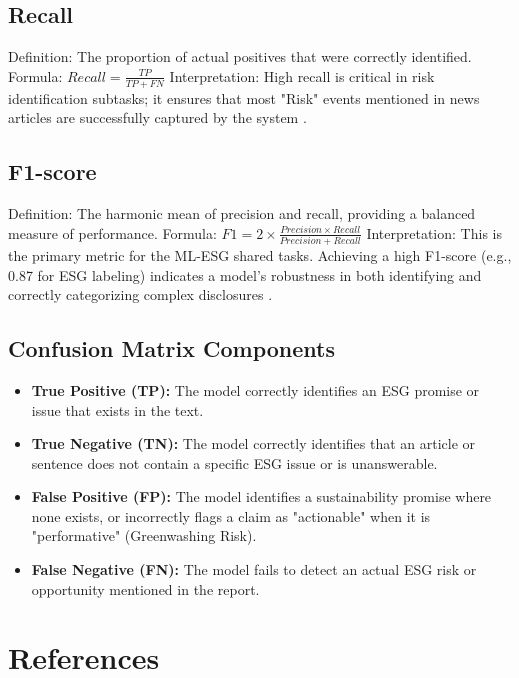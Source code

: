 \documentclass{article}
\begin{document}
\subsection{Recall}
Definition: The proportion of actual positives that were correctly identified.
Formula: $Recall = \frac{TP}{TP + FN}$
Interpretation: High recall is critical in risk identification subtasks; it ensures that most "Risk" events mentioned in news articles are successfully captured by the system \citep{cite_016}.

\subsection{F1-score}
Definition: The harmonic mean of precision and recall, providing a balanced measure of performance.
Formula: $F1 = 2 \times \frac{Precision \times Recall}{Precision + Recall}$
Interpretation: This is the primary metric for the ML-ESG shared tasks. Achieving a high F1-score (e.g., 0.87 for ESG labeling) indicates a model's robustness in both identifying and correctly categorizing complex disclosures \citep{cite_031, cite_019}.

\subsection{Confusion Matrix Components}
\begin{itemize}
\item \textbf{True Positive (TP):} The model correctly identifies an ESG promise or issue that exists in the text.
\item \textbf{True Negative (TN):} The model correctly identifies that an article or sentence does not contain a specific ESG issue or is unanswerable.
\item \textbf{False Positive (FP):} The model identifies a sustainability promise where none exists, or incorrectly flags a claim as "actionable" when it is "performative" (Greenwashing Risk).
\item \textbf{False Negative (FN):} The model fails to detect an actual ESG risk or opportunity mentioned in the report.
\end{itemize}

\section{References}
% 
\end{document}
